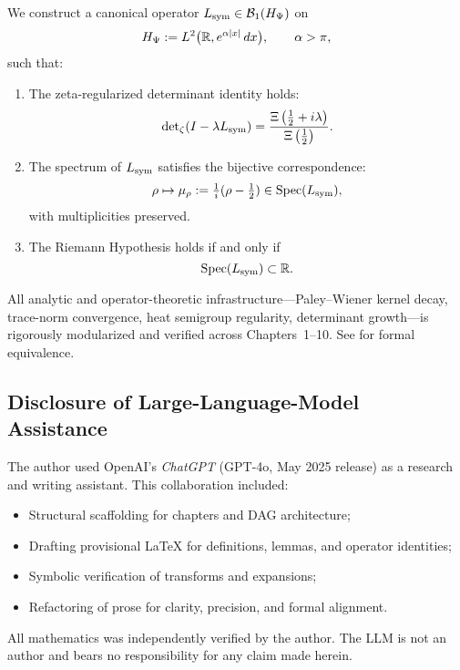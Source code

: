 \begin{tcolorbox}[colback=gray!3!white, colframe=black!75!white]
We construct a canonical operator \( L_{\mathrm{sym}} \in \mathcal{B}_1(H_{\Psi}) \) on
\[
H_{\Psi} := L^2\big(\mathbb{R}, e^{\alpha |x|} \, dx\big), \qquad \alpha > \pi,
\]
such that:
\begin{enumerate}
  \item The zeta-regularized determinant identity holds:
  \[
  \det\nolimits_{\zeta}(I - \lambda L_{\mathrm{sym}}) = \frac{\Xi\left(\tfrac{1}{2} + i\lambda\right)}{\Xi\left(\tfrac{1}{2}\right)}.
  \]
  \item The spectrum of \( L_{\mathrm{sym}} \) satisfies the bijective correspondence:
  \[
  \rho \mapsto \mu_\rho := \tfrac{1}{i}(\rho - \tfrac{1}{2}) \in \operatorname{Spec}(L_{\mathrm{sym}}),
  \]
  with multiplicities preserved.
  \item The Riemann Hypothesis holds if and only if
  \[
  \operatorname{Spec}(L_{\mathrm{sym}}) \subset \mathbb{R}.
  \]
\end{enumerate}
All analytic and operator-theoretic infrastructure—Paley–Wiener kernel decay, trace-norm convergence, heat semigroup regularity, determinant growth—is rigorously modularized and verified across Chapters~1–10. See  for formal equivalence.
\end{tcolorbox}

\subsection*{Disclosure of Large-Language-Model Assistance}

The author used OpenAI’s \emph{ChatGPT} (GPT-4o, May 2025 release) as a research and writing assistant. This collaboration included:

\begin{itemize}
  \item Structural scaffolding for chapters and DAG architecture;
  \item Drafting provisional \LaTeX{} for definitions, lemmas, and operator identities;
  \item Symbolic verification of transforms and expansions;
  \item Refactoring of prose for clarity, precision, and formal alignment.
\end{itemize}

All mathematics was independently verified by the author. The LLM is not an author and bears no responsibility for any claim made herein.
